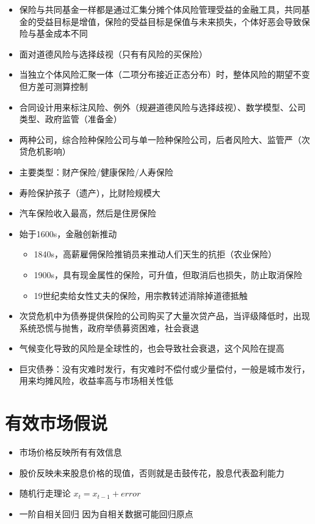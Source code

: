 \documentclass[]{book}
\providecommand{\tightlist}{%
  \setlength{\itemsep}{0pt}\setlength{\parskip}{0pt}}
\begin{document}
\begin{itemize}
\tightlist
\item
  保险与共同基金一样都是通过汇集分摊个体风险管理受益的金融工具，共同基金的受益目标是增值，保险的受益目标是保值与未来损失，个体好恶会导致保险与基金成本不同
\item
  面对道德风险与选择歧视（只有有风险的买保险）
\item
  当独立个体风险汇聚一体（二项分布接近正态分布）时，整体风险的期望不变但方差可测算控制
\item
  合同设计用来标注风险、例外（规避道德风险与选择歧视）、数学模型、公司类型、政府监管（准备金）
\item
  两种公司，综合险种保险公司与单一险种保险公司，后者风险大、监管严（次贷危机影响）
\item
  主要类型：财产保险/健康保险/人寿保险
\item
  寿险保护孩子（遗产），比财险规模大
\item
  汽车保险收入最高，然后是住房保险
\item
  始于1600s，金融创新推动

  \begin{itemize}
  \tightlist
  \item
    1840s，高薪雇佣保险推销员来推动人们天生的抗拒（农业保险）
  \item
    1900s，具有现金属性的保险，可升值，但取消后也损失，防止取消保险
  \item
    19世纪卖给女性丈夫的保险，用宗教转述消除掉道德抵触
  \end{itemize}
\item
  次贷危机中为债券提供保险的公司购买了大量次贷产品，当评级降低时，出现系统恐慌与抛售，政府举债募资困难，社会衰退
\item
  气候变化导致的风险是全球性的，也会导致社会衰退，这个风险在提高
\item
  巨灾债券：没有灾难时发行，有灾难时不偿付或少量偿付，一般是城市发行，用来均摊风险，收益率高与市场相关性低
\end{itemize}

\hypertarget{ux6709ux6548ux5e02ux573aux5047ux8bf4}{%
\section{有效市场假说}\label{ux6709ux6548ux5e02ux573aux5047ux8bf4}}

\begin{itemize}
\tightlist
\item
  市场价格反映所有有效信息
\item
  股价反映未来股息价格的现值，否则就是击鼓传花，股息代表盈利能力
\item
  随机行走理论 \(x_t = x_{t-1}+error\)
\item
  一阶自相关回归 因为自相关数据可能回归原点
\end{itemize}
\end{document}
